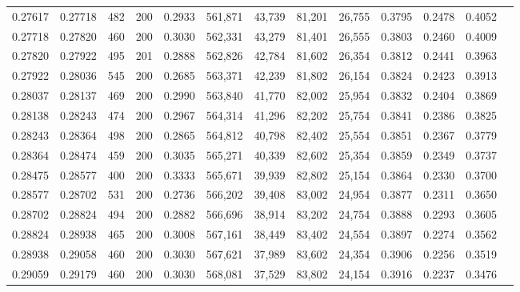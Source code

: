 \begin{tabular}{rrrrrrrrrrrrr}
0.27617 & 0.27718 &   482 & 200 &                                     0.2933 & 561,871 &  43,739 &  81,201 &  26,755 & 0.3795 & 0.2478 & 0.4052 \\
0.27718 & 0.27820 &   460 & 200 &                                     0.3030 & 562,331 &  43,279 &  81,401 &  26,555 & 0.3803 & 0.2460 & 0.4009 \\
0.27820 & 0.27922 &   495 & 201 &                                     0.2888 & 562,826 &  42,784 &  81,602 &  26,354 & 0.3812 & 0.2441 & 0.3963 \\
0.27922 & 0.28036 &   545 & 200 &                                     0.2685 & 563,371 &  42,239 &  81,802 &  26,154 & 0.3824 & 0.2423 & 0.3913 \\
0.28037 & 0.28137 &   469 & 200 &                                     0.2990 & 563,840 &  41,770 &  82,002 &  25,954 & 0.3832 & 0.2404 & 0.3869 \\
0.28138 & 0.28243 &   474 & 200 &                                     0.2967 & 564,314 &  41,296 &  82,202 &  25,754 & 0.3841 & 0.2386 & 0.3825 \\
0.28243 & 0.28364 &   498 & 200 &                                     0.2865 & 564,812 &  40,798 &  82,402 &  25,554 & 0.3851 & 0.2367 & 0.3779 \\
0.28364 & 0.28474 &   459 & 200 &                                     0.3035 & 565,271 &  40,339 &  82,602 &  25,354 & 0.3859 & 0.2349 & 0.3737 \\
0.28475 & 0.28577 &   400 & 200 &                                     0.3333 & 565,671 &  39,939 &  82,802 &  25,154 & 0.3864 & 0.2330 & 0.3700 \\
0.28577 & 0.28702 &   531 & 200 &                                     0.2736 & 566,202 &  39,408 &  83,002 &  24,954 & 0.3877 & 0.2311 & 0.3650 \\
0.28702 & 0.28824 &   494 & 200 &                                     0.2882 & 566,696 &  38,914 &  83,202 &  24,754 & 0.3888 & 0.2293 & 0.3605 \\
0.28824 & 0.28938 &   465 & 200 &                                     0.3008 & 567,161 &  38,449 &  83,402 &  24,554 & 0.3897 & 0.2274 & 0.3562 \\
0.28938 & 0.29058 &   460 & 200 &                                     0.3030 & 567,621 &  37,989 &  83,602 &  24,354 & 0.3906 & 0.2256 & 0.3519 \\
0.29059 & 0.29179 &   460 & 200 &                                     0.3030 & 568,081 &  37,529 &  83,802 &  24,154 & 0.3916 & 0.2237 & 0.3476 \\

\end{tabular}
